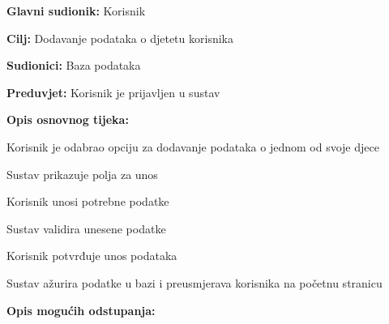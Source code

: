 					\noindent {}
					\begin{packed_item}
	
						\item \textbf{Glavni sudionik: }Korisnik
						\item  \textbf{Cilj:} Dodavanje podataka o djetetu korisnika
						\item  \textbf{Sudionici:} Baza podataka
						\item  \textbf{Preduvjet:} Korisnik je prijavljen u sustav
						\item  \textbf{Opis osnovnog tijeka:}
						
						\item[] \begin{packed_enum}
							\item Korisnik je odabrao opciju za dodavanje podataka o jednom od svoje djece
							\item Sustav prikazuje polja za unos
							\item Korisnik unosi potrebne podatke
							\item Sustav validira unesene podatke
							\item Korisnik potvrđuje unos podataka
							\item Sustav ažurira podatke u bazi i preusmjerava korisnika na početnu stranicu
						\end{packed_enum}

						\eject

						\item  \textbf{Opis mogućih odstupanja:}


\end{packed_item}
